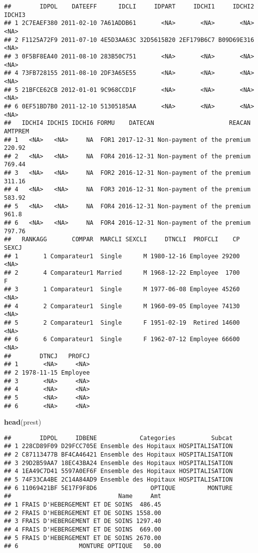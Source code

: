\documentclass[
]{article}
\newenvironment{Shaded}{\begin{snugshade}}{\end{snugshade}}
\newcommand{\KeywordTok}[1]{\textcolor[rgb]{0.13,0.29,0.53}{\textbf{#1}}}
\newcommand{\NormalTok}[1]{#1}
\begin{document}
\begin{verbatim}
##        IDPOL    DATEEFF      IDCLI     IDPART     IDCHI1     IDCHI2 IDCHI3
## 1 2C7EAEF380 2011-02-10 7A61ADDB61       <NA>       <NA>       <NA>   <NA>
## 2 F1125A72F9 2011-07-10 4E5D3AA63C 32D5615B20 2EF179B6C7 B09D69E316   <NA>
## 3 0F5BF8EA40 2011-08-10 283B50C751       <NA>       <NA>       <NA>   <NA>
## 4 73FB728155 2011-08-10 2DF3A65E55       <NA>       <NA>       <NA>   <NA>
## 5 21BFCE62CB 2012-01-01 9C968CCD1F       <NA>       <NA>       <NA>   <NA>
## 6 0EF51BD7B0 2011-12-10 51305185AA       <NA>       <NA>       <NA>   <NA>
##   IDCHI4 IDCHI5 IDCHI6 FORMU    DATECAN                     REACAN AMTPREM
## 1   <NA>   <NA>     NA  FOR1 2017-12-31 Non-payment of the premium  220.92
## 2   <NA>   <NA>     NA  FOR4 2016-12-31 Non-payment of the premium  769.44
## 3   <NA>   <NA>     NA  FOR2 2016-12-31 Non-payment of the premium  311.16
## 4   <NA>   <NA>     NA  FOR3 2016-12-31 Non-payment of the premium  583.92
## 5   <NA>   <NA>     NA  FOR4 2016-12-31 Non-payment of the premium   961.8
## 6   <NA>   <NA>     NA  FOR4 2016-12-31 Non-payment of the premium  797.76
##   RANKAGG       COMPAR  MARCLI SEXCLI     DTNCLI  PROFCLI    CP SEXCJ
## 1       1 Comparateur1  Single      M 1980-12-16 Employee 29200  <NA>
## 2       4 Comparateur1 Married      M 1968-12-22 Employee  1700     F
## 3       1 Comparateur1  Single      M 1977-06-08 Employee 45260  <NA>
## 4       2 Comparateur1  Single      M 1960-09-05 Employee 74130  <NA>
## 5       2 Comparateur1  Single      F 1951-02-19  Retired 14600  <NA>
## 6       6 Comparateur1  Single      F 1962-07-12 Employee 66600  <NA>
##        DTNCJ   PROFCJ
## 1       <NA>     <NA>
## 2 1978-11-15 Employee
## 3       <NA>     <NA>
## 4       <NA>     <NA>
## 5       <NA>     <NA>
## 6       <NA>     <NA>
\end{verbatim}

\begin{Shaded}
\begin{Highlighting}[]
\KeywordTok{head}\NormalTok{(prest)}
\end{Highlighting}
\end{Shaded}

\begin{verbatim}
##        IDPOL     IDBENE            Categories          Subcat
## 1 228CD89F09 D29FCC705E Ensemble des Hopitaux HOSPITALISATION
## 2 C87113477B BF4CA46421 Ensemble des Hopitaux HOSPITALISATION
## 3 29D2B59AA7 18EC43BA24 Ensemble des Hopitaux HOSPITALISATION
## 4 1EA49C7D41 5597A0EF6F Ensemble des Hopitaux HOSPITALISATION
## 5 74F33CA4BE 2C14A84AD9 Ensemble des Hopitaux HOSPITALISATION
## 6 11069421BF 5E17F9F8D6               OPTIQUE         MONTURE
##                              Name     Amt
## 1 FRAIS D'HEBERGEMENT ET DE SOINS  486.45
## 2 FRAIS D'HEBERGEMENT ET DE SOINS 1558.00
## 3 FRAIS D'HEBERGEMENT ET DE SOINS 1297.40
## 4 FRAIS D'HEBERGEMENT ET DE SOINS  669.00
## 5 FRAIS D'HEBERGEMENT ET DE SOINS 2670.00
## 6                 MONTURE OPTIQUE   50.00
\end{verbatim}
\end{document}
